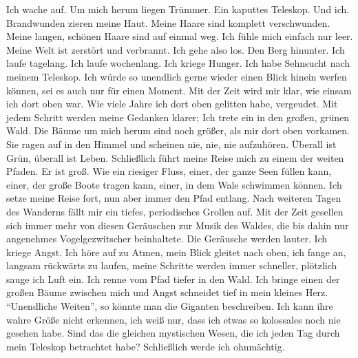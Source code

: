 \documentclass{article}
\begin{document}
	Ich wache auf.  
	Um mich herum liegen Trümmer. Ein kaputtes Teleskop. Und ich. Brandwunden zieren meine Haut. Meine Haare sind komplett verschwunden. Meine langen, schönen Haare sind auf einmal weg. Ich fühle mich einfach nur leer. Meine Welt ist zerstört und verbrannt. Ich gehe also los. Den Berg hinunter. Ich laufe tagelang. Ich laufe wochenlang. Ich kriege Hunger. Ich habe Sehnsucht nach meinem Teleskop. Ich würde so unendlich gerne wieder einen Blick hinein werfen können, sei es auch nur für einen Moment. Mit der Zeit wird mir klar, wie einsam ich dort oben war. Wie viele Jahre ich dort oben gelitten habe, vergeudet. Mit jedem Schritt werden meine Gedanken klarer; Ich trete ein in den großen, grünen Wald. Die Bäume um mich herum sind noch größer, als mir dort oben vorkamen. Sie ragen auf in den Himmel und scheinen nie, nie, nie aufzuhören. Überall ist Grün, überall ist Leben. Schließlich führt meine Reise mich zu einem der weiten Pfaden. Er ist groß. Wie ein riesiger Fluss, einer, der ganze Seen füllen kann, einer, der große Boote tragen kann, einer, in dem Wale schwimmen können. Ich setze meine Reise fort, nun aber immer den Pfad entlang. Nach weiteren Tagen des Wanderns fällt mir ein tiefes, periodisches Grollen auf. Mit der Zeit gesellen sich immer mehr von diesen Geräuschen zur Musik des Waldes, die bis dahin nur angenehmes Vogelgezwitscher beinhaltete. Die Geräusche werden lauter. Ich kriege Angst. Ich höre auf zu Atmen, mein Blick gleitet nach oben, ich fange an, langsam rückwärts zu laufen, meine Schritte werden immer schneller, plötzlich sauge ich Luft ein. Ich renne vom Pfad tiefer in den Wald. Ich bringe einen der großen Bäume zwischen mich und  
	Angst  
	schneidet tief in mein kleines Herz.  
	“Unendliche Weiten”, so könnte man die Giganten beschreiben. Ich kann ihre wahre Größe nicht erkennen, ich weiß nur, dass ich etwas so kolossales noch nie gesehen habe. Sind das die gleichen mystischen Wesen, die ich jeden Tag durch mein Teleskop betrachtet habe? Schließlich werde ich ohnmächtig.
	
\end{document}
